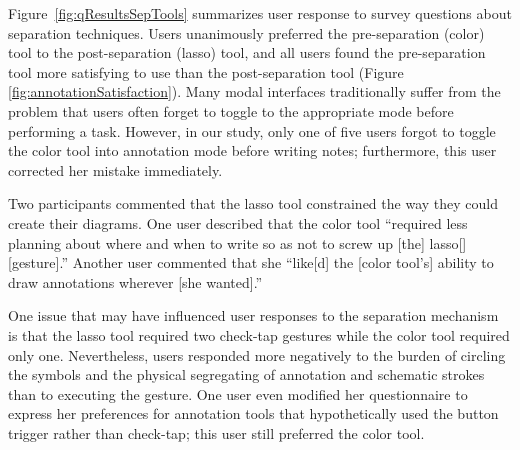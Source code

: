 \documentclass{elsart}
\begin{document}
Figure~\ref{fig:qResultsSepTools} summarizes user response to
survey questions about separation techniques.  
Users unanimously preferred the pre-separation (color) tool to the
post-separation (lasso) tool, and all users found the pre-separation
tool more satisfying to use than the post-separation tool (Figure
\ref{fig:annotationSatisfaction}).  Many modal interfaces
traditionally suffer from the problem that users often forget to
toggle to the appropriate mode before performing a task.  However, in
our study, only one of five users forgot to toggle the color tool into
annotation mode before writing notes; furthermore, this user corrected
her mistake immediately.

Two participants commented that the lasso tool constrained the way
they could create their diagrams.  One user described that
the color tool ``required less planning about where and when to write
so as not to screw up [the] lasso[] [gesture].''  Another user
commented that she ``like[d] the [color tool's] ability to draw
annotations wherever [she wanted].''

One issue that may have influenced user responses to the separation
mechanism is that the lasso tool required two check-tap gestures while
the color tool required only one.  Nevertheless, users responded more
negatively to the burden of circling the symbols and the physical
segregating of annotation and schematic strokes than to executing the
gesture.  One user even modified her questionnaire to express her
preferences for annotation tools that hypothetically used the button
trigger rather than check-tap; this user still preferred the color
tool.

\end{document}
